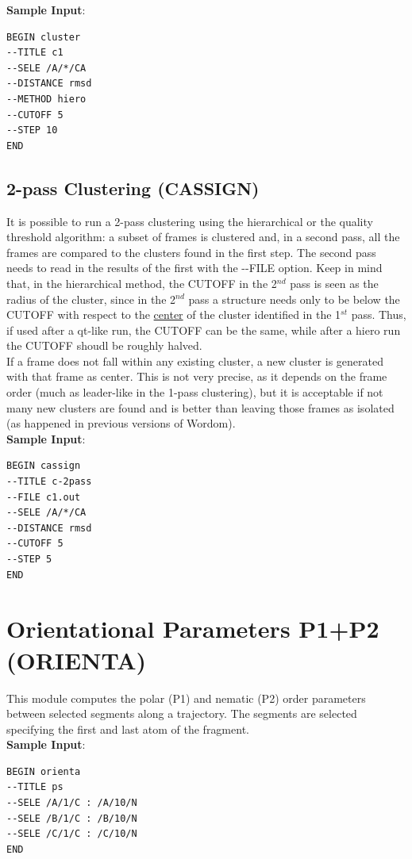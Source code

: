\documentclass[11pt,twoside,onecolumn,a4paper,openright,notitlepage]{book}[2001/04/21]
\begin{document}
\textbf{\large Sample Input}:
\begin{verbatim}
BEGIN cluster
--TITLE c1
--SELE /A/*/CA
--DISTANCE rmsd
--METHOD hiero
--CUTOFF 5
--STEP 10
END
\end{verbatim}

\subsection{2-pass Clustering (CASSIGN)}
It is possible to run a 2-pass clustering using the hierarchical or the quality threshold algorithm: a subset of frames is clustered and, in a second pass, all the frames are compared to the clusters found in the first step. The second pass needs to read in the results of the first with the -{}-FILE option. Keep in mind that, in the hierarchical method, the CUTOFF in the 2$^{nd}$ pass is seen as the radius of the cluster, since in the 2$^{nd}$ pass a structure needs only to be below the CUTOFF with respect to the \underline{center} of the cluster identified in the 1$^{st}$ pass. Thus, if used after a qt-like run, the CUTOFF can be the same, while after a hiero run the CUTOFF shoudl be roughly halved.\\
If a frame does not fall within any existing cluster, a new cluster is generated with that frame as center. This is not very precise, as it depends on the frame order (much as leader-like in the 1-pass clustering), but it is acceptable if not many new clusters are found and is better than leaving those frames as isolated (as happened in previous versions of Wordom).\\

\textbf{\large Sample Input}:
\begin{verbatim}
BEGIN cassign
--TITLE c-2pass
--FILE c1.out
--SELE /A/*/CA
--DISTANCE rmsd
--CUTOFF 5
--STEP 5
END
\end{verbatim}
\clearpage

\section{Orientational Parameters P1+P2 (ORIENTA)}
This module computes the polar (P1) and nematic (P2) order parameters\cite{cecchini:amyloid} between selected segments along a trajectory. The segments are selected specifying the first and last atom of the fragment.\\

\textbf{\large Sample Input}:
\begin{verbatim}
BEGIN orienta
--TITLE ps
--SELE /A/1/C : /A/10/N
--SELE /B/1/C : /B/10/N
--SELE /C/1/C : /C/10/N
END
\end{verbatim}
\clearpage
\end{document}
